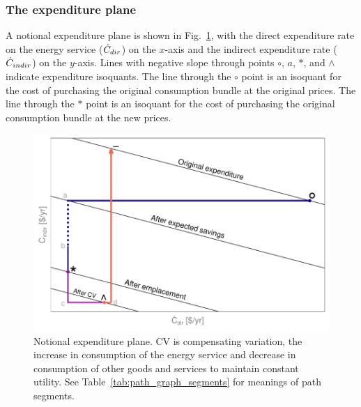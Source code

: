 \documentclass[12pt]{article}\usepackage[]{graphicx}\usepackage[]{xcolor}
\makeatletter
\def\maxwidth{ %
  \ifdim\Gin@nat@width>\linewidth
    \linewidth
  \else
    \Gin@nat@width
  \fi
}
\newenvironment{knitrout}{}{} %
\makeatother
\begin{document}
\subsubsection{The expenditure plane}
\label{sec:expenditure_path_graphs}

A notional expenditure plane is shown in Fig.~\ref{fig:ExampleCostPathGraph}, 
with 
the direct expenditure rate on the energy service ($\dot{C}_{dir}$) on the $x$-axis and 
the indirect expenditure rate ($\dot{C}_{indir}$) on the $y$-axis.
Lines with negative slope through points $\circ$, $a$, $*$, and $\wedge$
indicate expenditure isoquants.
The line through the $\circ$ point is an isoquant for the
cost of purchasing the original consumption bundle
at the original prices.
The line through the $*$ point is an isoquant for the
cost of purchasing the original consumption bundle
at the new prices.


\begin{knitrout}
\color{fgcolor}\begin{figure}

{\centering \includegraphics[width=\maxwidth]{figure/ExampleCostPathGraph-1} 

}

\caption{Notional expenditure plane. CV is compensating variation, the increase in consumption of the energy service and decrease in consumption of other goods and services to maintain constant utility. See Table~\ref{tab:path_graph_segments} for meanings of path segments.}\label{fig:ExampleCostPathGraph}
\end{figure}

\end{knitrout}
\end{document}
